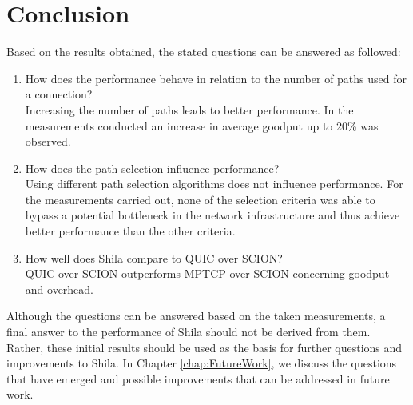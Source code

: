 \newpage

\section{Conclusion}

Based on the results obtained, the stated questions can be answered as followed:

 \begin{enumerate}
	\item How does the performance behave in relation to the number of paths used for a connection? \smallskip\\ Increasing the number of paths leads to better performance. In the measurements conducted an increase in average goodput up to 20\% was observed.
	\item How does the path selection influence performance?
	\smallskip\\ Using different path selection algorithms does not influence performance. For the measurements carried out, none of the selection criteria was able to bypass a potential bottleneck in the network infrastructure and thus achieve better performance than the other criteria.
	\item How well does Shila compare to QUIC over SCION?
	\smallskip\\ QUIC over SCION outperforms MPTCP over SCION concerning goodput and overhead.
\end{enumerate}

Although the questions can be answered based on the taken measurements, a final answer to the performance of Shila should not be derived from them. Rather, these initial results should be used as the basis for further questions and improvements to Shila. In Chapter \ref{chap:FutureWork}, we discuss the questions that have emerged and possible improvements that can be addressed in future work.  